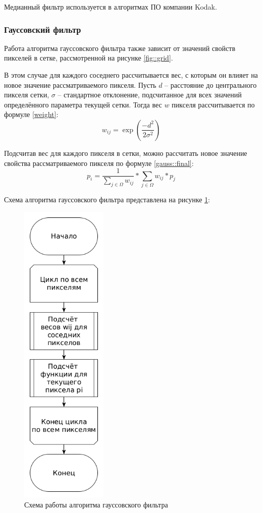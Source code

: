 Медианный фильтр используется в алгоритмах ПО компании Kodak.


\subsubsection{Гауссовский фильтр}
Работа алгоритма гауссовского фильтра также зависит от значений свойств пикселей в сетке, рассмотренной на рисунке \ref{fig::grid}.

В этом случае для каждого соседнего рассчитывается вес, с которым он влияет на новое значение рассматриваемого пикселя. 
Пусть $d$ -- расстояние до центрального пикселя сетки, $\sigma$ -- стандартное отклонение, подсчитанное для всех значений определённого параметра текущей сетки.
Тогда вес $w$ пикселя рассчитывается по формуле \ref{weight}:
\begin{equation}
	\label{weight}
	w_{ij} = \exp(\frac{-d^2}{2\sigma^2})
\end{equation}

Подсчитав вес для каждого пикселя в сетки, можно рассчитать новое значение свойства рассматриваемого пикселя по формуле \ref{gauss::final}:
\begin{equation}
	\label{gauss::final}
	p_i = \frac{1}{\sum_{j \in \Omega}^{} w_{ij}} * \sum_{j \in \Omega}^{} w_{ij} * p_j 
\end{equation}

Схема алгоритма гауссовского фильтра представлена на рисунке \ref{fig::gauss}:
\FloatBarrier
\begin{figure}[h]	
	\begin{center}
		\includegraphics[height=15cm]{inc/png/gauss.png}
	\end{center}
	\captionsetup{justification=centering}
	\caption{Схема работы алгоритма гауссовского фильтра}
	\label{fig::gauss}
\end{figure}
\FloatBarrier


